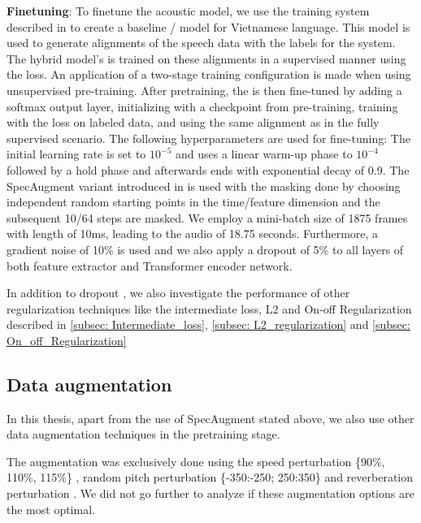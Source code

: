 \textbf{Finetuning}: To finetune the acoustic model, we use the training system described in \cite{RASR-hybrid_vs_attention} to create a baseline / model for Vietnamese language. 
This model is used to generate alignments of the speech data with the  labels for the  system. 
The hybrid model's  is trained on these alignments in a supervised manner using the  loss. 
An application of a two-stage training configuration is made when using unsupervised pre-training.
After pretraining, the  is then fine-tuned by adding a softmax output layer, initializing with a checkpoint from pre-training, training with the  loss on labeled data, and using the same alignment as in the fully supervised scenario.
The following hyperparameters are used for fine-tuning:
The initial learning rate is set to $10^{-5}$ and uses a linear warm-up phase to $10^{-4}$ followed by a hold phase and afterwards ends with exponential decay of 0.9.
The  SpecAugment variant introduced in \cite{wav2vec2} is used with the masking done by choosing independent random starting points in the time/feature dimension and the subsequent 10/64 steps are masked.
We employ a mini-batch size of 1875 frames with length of 10ms, leading to the audio of 18.75 seconds.
Furthermore, a gradient noise of 10\% is used and we also apply a dropout of 5\% to all layers of both feature extractor and Transformer encoder network.

In addition to dropout \cite{dropout}, we also investigate the performance of other regularization techniques like the intermediate loss, L2 and On-off Regularization described in \ref{subsec: Intermediate_loss}, \ref{subsec: L2_regularization} and \ref{subsec: On_off_Regularization}

\subsection{Data augmentation}

In this thesis, apart from the use of SpecAugment \cite{park2019specaugment} stated above, we also use other data augmentation techniques in the pretraining stage.

The augmentation was exclusively done using the speed perturbation \{90\%, 110\%, 115\%\} \cite{speed_perturbation}, random pitch perturbation \{-350:-250; 250:350\} \cite{pitch_perturbation} and reverberation perturbation \cite{reverb_perturbation}. 
We did not go further to analyze if these augmentation options are the most optimal.

